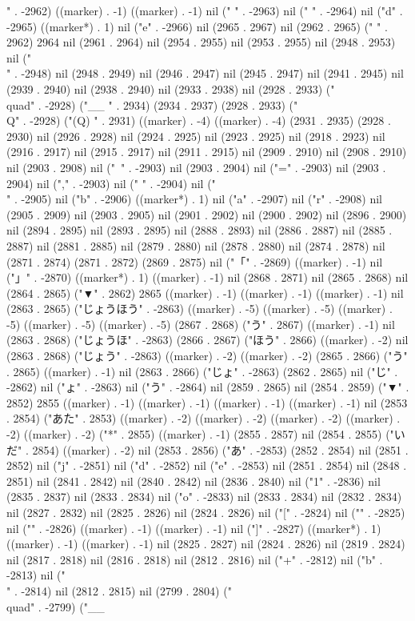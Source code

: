 " . -2962) ((marker) . -1) ((marker) . -1) nil (" " . -2963) nil (" " . -2964) nil ("d" . -2965) ((marker*) . 1) nil ("e" . -2966) nil (2965 . 2967) nil (2962 . 2965) ("  " . 2962) 2964 nil (2961 . 2964) nil (2954 . 2955) nil (2953 . 2955) nil (2948 . 2953) nil ("\\" . -2948) nil (2948 . 2949) nil (2946 . 2947) nil (2945 . 2947) nil (2941 . 2945) nil (2939 . 2940) nil (2938 . 2940) nil (2933 . 2938) nil (2928 . 2933) ("\\quad" . -2928) ("__
" . 2934) (2934 . 2937) (2928 . 2933) ("\\Q" . -2928) ("(Q)
" . 2931) ((marker) . -4) ((marker) . -4) (2931 . 2935) (2928 . 2930) nil (2926 . 2928) nil (2924 . 2925) nil (2923 . 2925) nil (2918 . 2923) nil (2916 . 2917) nil (2915 . 2917) nil (2911 . 2915) nil (2909 . 2910) nil (2908 . 2910) nil (2903 . 2908) nil ("~" . -2903) nil (2903 . 2904) nil ("=" . -2903) nil (2903 . 2904) nil ("," . -2903) nil (" " . -2904) nil ("\\" . -2905) nil ("b" . -2906) ((marker*) . 1) nil ("a" . -2907) nil ("r" . -2908) nil (2905 . 2909) nil (2903 . 2905) nil (2901 . 2902) nil (2900 . 2902) nil (2896 . 2900) nil (2894 . 2895) nil (2893 . 2895) nil (2888 . 2893) nil (2886 . 2887) nil (2885 . 2887) nil (2881 . 2885) nil (2879 . 2880) nil (2878 . 2880) nil (2874 . 2878) nil (2871 . 2874) (2871 . 2872) (2869 . 2875) nil ("「" . -2869) ((marker) . -1) nil ("」" . -2870) ((marker*) . 1) ((marker) . -1) nil (2868 . 2871) nil (2865 . 2868) nil (2864 . 2865) ("▼" . 2862) 2865 ((marker) . -1) ((marker) . -1) ((marker) . -1) nil (2863 . 2865) ("じょうほう" . -2863) ((marker) . -5) ((marker) . -5) ((marker) . -5) ((marker) . -5) ((marker) . -5) (2867 . 2868) ("う" . 2867) ((marker) . -1) nil (2863 . 2868) ("じょうほ" . -2863) (2866 . 2867) ("ほう" . 2866) ((marker) . -2) nil (2863 . 2868) ("じょう" . -2863) ((marker) . -2) ((marker) . -2) (2865 . 2866) ("う" . 2865) ((marker) . -1) nil (2863 . 2866) ("じょ" . -2863) (2862 . 2865) nil ("じ" . -2862) nil ("ょ" . -2863) nil ("う" . -2864) nil (2859 . 2865) nil (2854 . 2859) ("▼" . 2852) 2855 ((marker) . -1) ((marker) . -1) ((marker) . -1) ((marker) . -1) nil (2853 . 2854) ("あた" . 2853) ((marker) . -2) ((marker) . -2) ((marker) . -2) ((marker) . -2) ((marker) . -2) ("*" . 2855) ((marker) . -1) (2855 . 2857) nil (2854 . 2855) ("いだ" . 2854) ((marker) . -2) nil (2853 . 2856) ("あ" . -2853) (2852 . 2854) nil (2851 . 2852) nil ("j" . -2851) nil ("d" . -2852) nil ("e" . -2853) nil (2851 . 2854) nil (2848 . 2851) nil (2841 . 2842) nil (2840 . 2842) nil (2836 . 2840) nil ("1" . -2836) nil (2835 . 2837) nil (2833 . 2834) nil ("o" . -2833) nil (2833 . 2834) nil (2832 . 2834) nil (2827 . 2832) nil (2825 . 2826) nil (2824 . 2826) nil ("[" . -2824) nil ("{" . -2825) nil ("}" . -2826) ((marker) . -1) ((marker) . -1) nil ("]" . -2827) ((marker*) . 1) ((marker) . -1) ((marker) . -1) nil (2825 . 2827) nil (2824 . 2826) nil (2819 . 2824) nil (2817 . 2818) nil (2816 . 2818) nil (2812 . 2816) nil ("+" . -2812) nil ("b" . -2813) nil ("\\" . -2814) nil (2812 . 2815) nil (2799 . 2804) ("\\quad" . -2799) ("__
